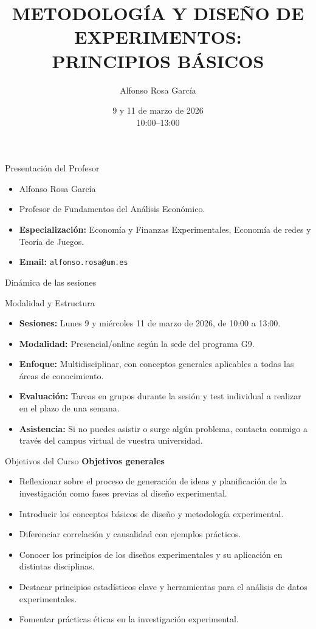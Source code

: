 ﻿\documentclass{beamer}
\title[DISEÑO DE EXPERIMENTOS]{METODOLOGÍA Y DISEÑO DE EXPERIMENTOS: \\ PRINCIPIOS BÁSICOS}
\author[Alfonso Rosa García]{Alfonso Rosa García }
\institute[G9]{\textbf{Grupo de Universidades G-9}}
\date{9 y 11 de marzo de 2026 \\ 10:00--13:00}
\begin{document}
\begin{frame}
  \titlepage
\end{frame}

\begin{frame}{Presentación del Profesor}
      \begin{itemize}
         \item Alfonso Rosa García
         \item Profesor de Fundamentos del Análisis Económico.
         \item \textbf{Especialización:} Economía y Finanzas Experimentales, Economía de redes y Teoría de Juegos.
         \item \textbf{Email:} \texttt{alfonso.rosa@um.es}
      \end{itemize}
\end{frame}

\begin{frame}{Dinámica de las sesiones}
   \begin{block}{Modalidad y Estructura}
      \begin{itemize}
         \item \textbf{Sesiones:} Lunes 9 y miércoles 11 de marzo de 2026, de 10:00 a 13:00.
         \item \textbf{Modalidad:} Presencial/online según la sede del programa G9.
         \item \textbf{Enfoque:} Multidisciplinar, con conceptos generales aplicables a todas las áreas de conocimiento.
         \item \textbf{Evaluación:} Tareas en grupos durante la sesión y test individual a realizar en el plazo de una semana.
         \item \textbf{Asistencia:} Si no puedes asistir o surge algún problema, contacta conmigo a través del campus virtual de vuestra universidad.
      \end{itemize}
   \end{block}
\end{frame}


\begin{frame}{Objetivos del Curso}
\textbf{Objetivos generales}
\begin{itemize}
    \item Reflexionar sobre el proceso de generación de ideas y planificación de la investigación como fases previas al diseño experimental.
    \item Introducir los conceptos básicos de diseño y metodología experimental.
    \item Diferenciar correlación y causalidad con ejemplos prácticos.
    \item Conocer los principios de los diseños experimentales y su aplicación en distintas disciplinas.
    \item Destacar principios estadísticos clave y herramientas para el análisis de datos experimentales.
    \item Fomentar prácticas éticas en la investigación experimental.
\end{itemize}
\end{frame}
\end{document}
